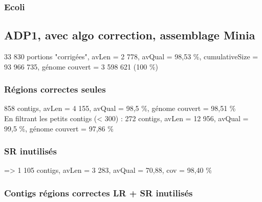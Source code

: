 \documentclass[12pt]{article}
\begin{document}
\subsubsection{Ecoli}


\subsection{ADP1, avec algo correction, assemblage Minia}

33 830 portions "corrigées", avLen = 2 778, avQual = 98,53 \%, cumulativeSize = 93 966 735, génome couvert = 3 598 621 (100 \%) \\
  
\subsubsection{Régions correctes seules}

858 contigs, avLen = 4 155, avQual = 98,5 \%, génome couvert = 98,51 \% \\

En filtrant les petits contigs (< 300) : 272 contigs, avLen = 12 956, avQual = 99,5 \%, génome couvert =  97,86 \%

\subsubsection{SR inutilisés}

=> 1 105 contigs, avLen = 3 283, avQual = 70,88, cov = 98,40 \%

\subsubsection{Contigs régions correctes LR + SR inutilisés}
\end{document}
